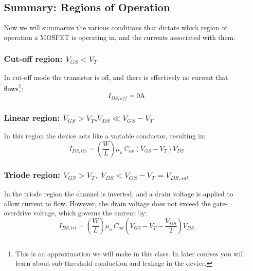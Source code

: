 \subsection{Summary: Regions of Operation}
Now we will summarize the various conditions that dictate which region of operation a MOSFET is operating in, and the currents associated with them.
\subsubsection{\textbf{Cut-off region:} $V_{GS} < V_T$}
In cut-off mode the transistor is off, and there is effectively no current that flows\footnote{This is an approximation we will make in this class.  In later courses you will learn about sub-threshold conduction and leakage in the device.}:
    \begin{equation*}
        \boxed{ I_{DS,off} = 0\mathrm{A} }
    \end{equation*}
\subsubsection{\textbf{Linear region:} $V_{GS} > V_T$,\;$V_{DS} \ll V_{GS} - V_T$}
In this region the device acts like a variable conductor, resulting in:
    \begin{equation*}
        \boxed{ I_{DS,lin} = \left( \frac{W}{L} \right) \mu_n\,C_{ox} \left( V_{GS} - V_T \right)V_{DS} }
    \end{equation*}
\subsubsection{\textbf{Triode region:} $V_{GS} > V_T,\;V_{DS} < V_{GS} - V_T = V_{DS,sat}$}
In the triode region the channel is inverted, and a drain voltage is applied to allow current to flow. However, the drain voltage does not exceed the gate-overdrive voltage, which governs the current by:
    \begin{equation*}
        \boxed{ I_{DS,tri} = \left( \frac{W}{L} \right) \mu_n\,C_{ox} \left( V_{GS} - V_T - \frac{V_{DS}}{2} \right)V_{DS} }
    \end{equation*}
